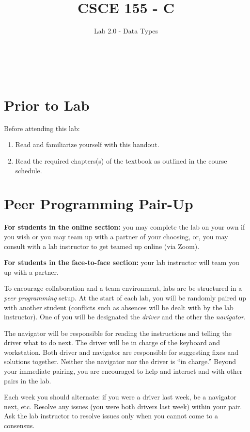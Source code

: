 \documentclass[12pt]{scrartcl}
\title{CSCE 155 - C}
\subtitle{Lab 2.0 - Data Types}
\author{~}
\date{~}
\begin{document}
\maketitle

\section*{Prior to Lab}

Before attending this lab:
\begin{enumerate}
  \item Read and familiarize yourself with this handout.
  \item Read the required chapters(s) of the textbook as 
  outlined in the course schedule.
\end{enumerate}

\section*{Peer Programming Pair-Up}

\textbf{For students in the online section:} you may complete
the lab on your own if you wish or you may team up with a partner
of your choosing, or, you may consult with a lab instructor to get
teamed up online (via Zoom).

\textbf{For students in the face-to-face section:} your
lab instructor will team you up with a partner.  

To encourage collaboration and a team environment, labs are be
structured in a \emph{peer programming} setup.  At the start of
each lab, you will be randomly paired up with another student 
(conflicts such as absences will be dealt with by the lab instructor).
One of you will be designated the \emph{driver} and the other
the \emph{navigator}.  

The navigator will be responsible for reading the instructions and
telling the driver what to do next.  The driver will be in charge of the
keyboard and workstation.  Both driver and navigator are responsible
for suggesting fixes and solutions together.  Neither the navigator
nor the driver is ``in charge.''  Beyond your immediate pairing, you
are encouraged to help and interact and with other pairs in the lab.

Each week you should alternate: if you were a driver last week, 
be a navigator next, etc.  Resolve any issues (you were both drivers
last week) within your pair.  Ask the lab instructor to resolve issues
only when you cannot come to a consensus.  
\end{document}
